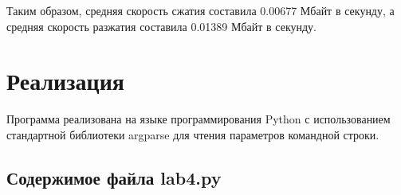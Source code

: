 \documentclass[a4paper,oneside]{article}
\theoremstyle{definition}
\begin{document}
Таким образом, средняя скорость сжатия составила 0.00677 Мбайт в секунду, а
средняя скорость разжатия составила 0.01389 Мбайт в секунду.


\section{Реализация}

Программа реализована на языке программирования Python с использованием
стандартной библиотеки argparse для чтения параметров командной строки.

\subsection{Содержимое файла lab4.py}
\inputminted{python}{../../lab4-py/lab4.py}
\end{document}
